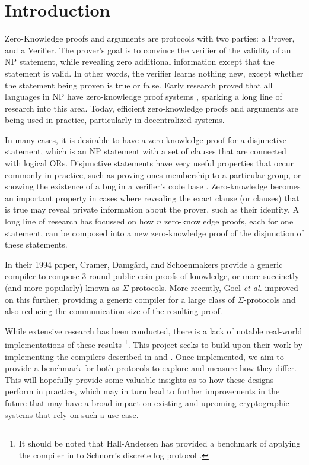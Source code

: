 \section{Introduction}

Zero-Knowledge proofs and arguments \cite{GMR85} are protocols with two parties: a Prover, and a Verifier. The prover's goal is to convince the verifier of the validity of an NP statement, while revealing zero additional information except that the statement is valid. In other words, the verifier learns nothing new, except whether the statement being proven is true or false. Early research proved that all languages in NP have zero-knowledge proof systems \cite{DBLP:conf/focs/GoldreichMW86}, sparking a long line of research into this area. Today, efficient zero-knowledge proofs and arguments are being used in practice, particularly in decentralized systems. 

In many cases, it is desirable to have a zero-knowledge proof for a disjunctive statement, which is an NP statement with a set of clauses that are connected with logical ORs.  Disjunctive statements have very useful properties that occur commonly in practice, such as proving ones membership to a particular group, or showing the existence of a bug in a verifier's code base \cite{StackedGF}. Zero-knowledge becomes an important property in cases where revealing the exact clause (or clauses) that is true may reveal private information about the prover, such as their identity. A long line of research has focussed on how $n$ zero-knowledge proofs, each for one statement, can be composed into a new zero-knowledge proof of the disjunction of these statements. 

In their 1994 paper, Cramer, Damg{\aa}rd, and Schoenmakers \cite{CDS94} provide a generic compiler to compose 3-round public coin proofs of knowledge, or more succinctly (and more popularly) known as $\Sigma$-protocols. %
More recently, Goel {\em et al.} \cite{StackingSigmas} improved on this further, providing a generic compiler for a large class of $\Sigma$-protocols and also reducing the communication size of the resulting proof. 

While extensive research has been conducted, there is a lack of notable real-world implementations of these results
\footnote{It should be noted that Hall-Andersen \cite{MHAStackSig} has provided a benchmark of applying the compiler in \cite{StackingSigmas} to Schnorr's discrete log protocol \cite{Schnorr}.}. This project seeks to build upon their work by implementing the compilers described in \cite{CDS94} and \cite{StackingSigmas}. Once implemented, we aim to provide a benchmark for both protocols to explore and measure how they differ. This will hopefully provide some valuable insights as to how these designs perform in practice, which may in turn lead to further improvements in the future that may have a broad impact on existing and upcoming cryptographic systems that rely on such a use case. 

